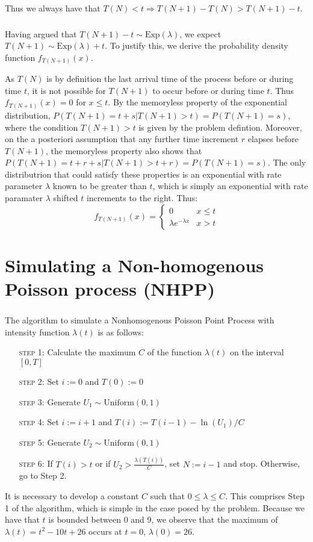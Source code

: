 \documentclass[11pt, oneside]{article}   	%
\begin{document}
Thus we always have that $T(N) < t \Rightarrow T(N + 1) - T(N) > T(N + 1) - t$.
\section{}
Having argued that $T(N + 1) - t \sim \text{Exp}(\lambda)$, we expect $T(N + 1) \sim \text{Exp}(\lambda) + t$. To justify this, we derive the probability density function $f_{T(N + 1)}(x)$.

As $T(N)$ is by definition the last arrival time of the process before or during time $t$, it is not possible for $T(N + 1)$ to occur before or during time $t$. Thus $f_{T(N + 1)}(x) = 0$ for $x \leq t$. By the memoryless property of the exponential distribution, $P(T(N + 1) = t + s | T(N + 1) > t) = P(T(N + 1) = s)$, where the condition $T(N + 1) > t$ is given by the problem defintion. Moreover, on the a posteriori assumption that any further time increment $r$ elapses before $T(N + 1)$, the memoryless property also shows that $P(T(N + 1) = t + r + s | T(N + 1) > t + r) = P(T(N + 1) = s)$. The only distributrion that could satisfy these properties is an exponential with rate parameter $\lambda$ known to be greater than $t$, which is simply an exponential with rate paramater $\lambda$ shifted $t$ increments to the right. Thus:
\[
f_{T(N + 1)}(x) =
\begin{cases} 
      0 & x \leq t \\
      \lambda e^{-\lambda x} & x > t 
   \end{cases}
\]

\part{Simulating a Non-homogenous Poisson process (NHPP)}
\section{}
The algorithm to simulate a Nonhomogenous Poisson Point Process with intensity function $\lambda(t)$ is as follows:
\begin{enumerate}[leftmargin=30pt,labelindent=65pt,itemindent=30pt]
\item[\textsc{step 1:}] Calculate the maximum $C$ of the function $\lambda(t)$ on the interval $[0,T]$
\item[\textsc{step 2:}] Set $i:=0$ and $T(0):=0$
\item[\textsc{step 3:}] Generate $U_1 \sim \text{Uniform}(0,1)$
\item[\textsc{step 4:}] Set $i := i + 1$ and $T(i) := T(i-1) - \ln(U_1)/C$
\item[\textsc{step 5:}] Generate $U_2 \sim\text{Uniform}(0,1)$
\item[\textsc{step 6:}] If $T(i) > t$ or if $U_2 > \frac{\lambda(T(i))}{C}$, set $N:=i-1$ and stop. Otherwise, go to Step 2.
\end{enumerate}
It is necessary to develop a constant $C$ such that $0\leq{\lambda}\leq{C}$. This comprises Step 1 of the algorithm, which is simple in the case posed by the problem. Because we have that $t$ is bounded between 0 and 9, we observe that the maximum of $\lambda(t) = t^2 - 10t + 26$ occurs at $t=0$, $\lambda(0)=26$.\\
\end{document}
